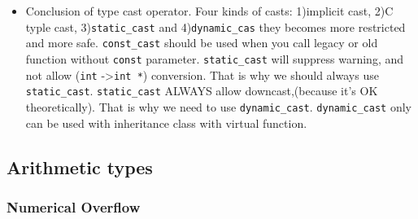 \documentclass[a4paper,11pt,twoside]{book}
\begin{document}
\begin{itemize}
	
	\item Conclusion of type cast operator. Four kinds of casts: 1)implicit cast, 2)C typle cast, 3)\texttt{static\_cast} and 4)\texttt{dynamic\_cas} they becomes more restricted and more safe. \texttt{const\_cast} should be used when you call legacy or old function without \texttt{const} parameter. \texttt{static\_cast} will suppress warning, and not allow (\texttt{int} ->\texttt{int *}) conversion. That is why we should always use \texttt{static\_cast}. \texttt{static\_cast} ALWAYS allow downcast,(because it's OK theoretically). That is why we need to use \texttt{dynamic\_cast}. \texttt{dynamic\_cast} only can be used with inheritance class with virtual function. 
	
\end{itemize}

\subsection{Arithmetic types}
\subsubsection{Numerical Overflow}
\end{document}
